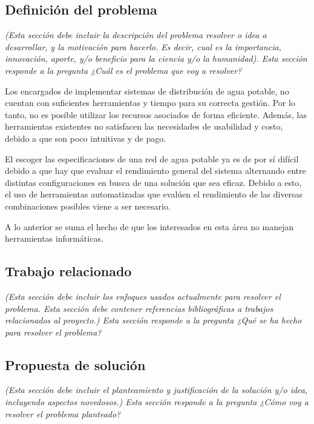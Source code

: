 \documentclass[11pt,letterpaper]{article}
\begin{document}
\subsection{Definición del problema} 
\emph{(Esta sección debe incluir la descripción del problema resolver o idea a desarrollar, y la motivación para hacerlo. Es decir, cual es la importancia, innovación, aporte, y/o beneficio para la ciencia y/o la humanidad). Esta sección responde a la pregunta ¿Cuál es el problema que voy a resolver?}

Los encargados de implementar sistemas de distribución de agua potable, no cuentan con suficientes herramientas y  tiempo para su correcta gestión. Por lo tanto, no es posible utilizar los recursos asociados de forma eficiente. Además, las herramientas existentes no satisfacen las necesidades de usabilidad y costo, debido a que son poco intuitivas y de pago.

El escoger las especificaciones de una red de agua potable ya es de por sí difícil debido a que hay que evaluar el rendimiento general del sistema alternando entre distintas configuraciones en busca de una solución que sea eficaz. Debido a esto, el uso de herramientas automatizadas que evalúen el rendimiento de las diversas combinaciones posibles viene a ser necesario.

A lo anterior se suma el hecho de que los interesados en esta área no manejan herramientas informáticas.




\subsection{Trabajo relacionado} 
\emph{(Esta sección debe incluir los enfoques usados actualmente para resolver el problema. Esta sección debe contener referencias bibliográficas a trabajos relacionados al proyecto.) Esta sección responde a la pregunta ¿Qué se ha hecho para resolver el problema?}

\subsection{Propuesta de solución}
\emph{(Esta sección debe incluir el planteamiento y justificación de la solución y/o idea, incluyendo aspectos novedosos.) Esta sección responde a la pregunta ¿Cómo voy a resolver el problema planteado?}
\end{document}
